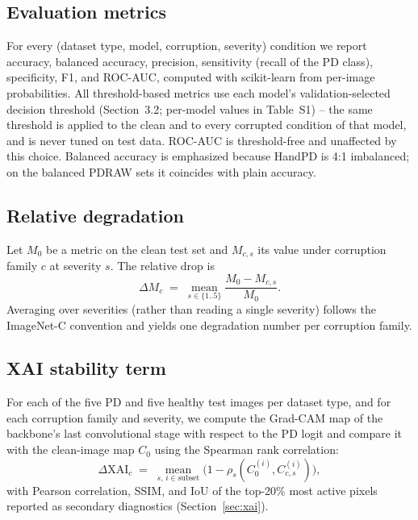 \documentclass[11pt,a4paper]{article}
\begin{document}
\subsection{Evaluation metrics}

For every (dataset type, model, corruption, severity) condition we report
accuracy, balanced accuracy, precision, sensitivity (recall of the PD class),
specificity, F1, and ROC-AUC, computed with scikit-learn from per-image
probabilities. All threshold-based metrics use each model's validation-selected
decision threshold (Section~3.2; per-model values in Table~S1) -- the same
threshold is applied to the clean and to every corrupted condition of that
model, and is never tuned on test data. ROC-AUC is threshold-free and
unaffected by this choice. Balanced accuracy is emphasized because HandPD
is 4:1 imbalanced; on the balanced PDRAW sets it coincides with plain
accuracy.

\subsection{Relative degradation}
Let $M_0$ be a metric on the clean test set and $M_{c,s}$ its value under
corruption family $c$ at severity $s$. The relative drop is
\begin{equation}
\Delta M_{c} \;=\; \operatorname*{mean}_{s \in \{1..5\}}
\frac{M_0 - M_{c,s}}{M_0}.
\label{eq:drop}
\end{equation}
Averaging over severities (rather than reading a single severity) follows the
ImageNet-C convention and yields one degradation number per corruption family.

\subsection{XAI stability term}
For each of the five PD and five healthy test images per dataset type, and
for each corruption family and severity, we compute the Grad-CAM map
\cite{selvaraju2017} of the backbone's last convolutional stage with respect
to the PD logit and compare it with the clean-image map $C_0$ using the
Spearman rank correlation:
\begin{equation}
\Delta\mathrm{XAI}_{c} \;=\; \operatorname*{mean}_{s,\, i \in \text{subset}}
\bigl(1 - \rho_s\!\left(C_0^{(i)}, C_{c,s}^{(i)}\right)\bigr),
\end{equation}
with Pearson correlation, SSIM, and IoU of the top-20\% most active pixels
reported as secondary diagnostics (Section~\ref{sec:xai}).
\end{document}
